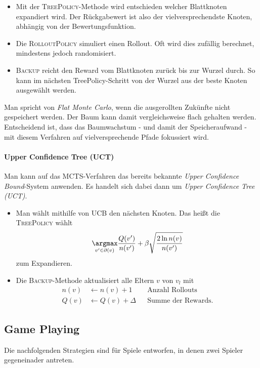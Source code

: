 \documentclass[ngerman]{../LaTeX-Templates/Paper/paper}
\begin{document}
\begin{itemize}
	\item Mit der \textsc{TreePolicy}-Methode wird entschieden welcher Blattknoten expandiert wird. Der Rückgabewert ist also der vielversprechendste Knoten, abhängig von der Bewertungsfunktion.
	\item Die \textsc{RolloutPolicy} simuliert einen Rollout. Oft wird dies zufällig berechnet, mindestens jedoch randomisiert.
	\item \textsc{Backup} reicht den Reward vom Blattknoten zurück bis zur Wurzel durch. So kann im nächsten TreePolicy-Schritt von der Wurzel aus der beste Knoten ausgewählt werden. 
\end{itemize}
Man spricht von \emph{Flat Monte Carlo}, wenn die ausgerollten Zukünfte nicht gespeichert werden. Der Baum kann damit vergleichsweise flach gehalten werden. Entscheidend ist, dass das Baumwachstum - und damit der Speicheraufwand - mit diesem Verfahren auf vielversprechende Pfade fokussiert wird.

\paragraph{Upper Confidence Tree (UCT)}
Man kann auf das MCTS-Verfahren das bereits bekannte {\itshape Upper Confidence Bound}-System anwenden. Es handelt sich dabei dann um {\itshape Upper Confidence Tree (UCT)}.
\begin{itemize}
	\item Man wählt mithilfe von UCB den nächsten Knoten. Das heißt die \textsc{TreePolicy} wählt
	\begin{equation*}
		\underset{v'\in\partial(v)}\argmax\frac{Q(v')}{n(v')}+\beta\sqrt{\frac{2\ln n(v)}{n(v')}}
	\end{equation*}
	zum Expandieren.
	\item Die \textsc{Backup}-Methode aktualisiert alle Eltern $v$ von $v_l$ mit
	\begin{align*}
		n(v)&\leftarrow n(v)+1&&\text{Anzahl Rollouts}\\
		Q(v)&\leftarrow Q(v)+\Delta&&\text{Summe der Rewards.}
	\end{align*}
\end{itemize}


\subsection{Game Playing}
Die nachfolgenden Strategien sind für Spiele entworfen, in denen zwei Spieler gegeneinader antreten.
\end{document}
